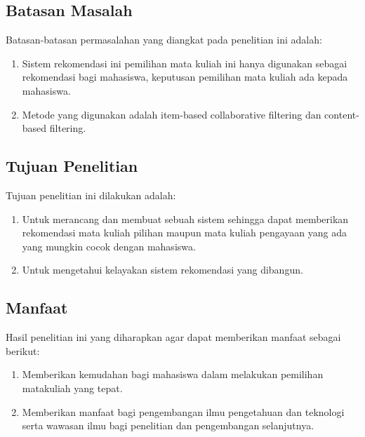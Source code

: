 \subsection{Batasan Masalah}
Batasan-batasan permasalahan yang diangkat pada penelitian ini adalah:
\begin{enumerate}
      \setlength\itemsep{0em}
      \item Sistem rekomendasi ini pemilihan mata kuliah
            ini hanya digunakan sebagai rekomendasi bagi
            mahasiswa, keputusan pemilihan mata kuliah
            ada kepada mahasiswa.
      \item Metode yang digunakan adalah item-based
            collaborative filtering dan content-based
            filtering.
\end{enumerate}

\subsection{Tujuan Penelitian}
Tujuan penelitian ini dilakukan adalah:
\begin{enumerate}
      \setlength\itemsep{0em}
      \item Untuk merancang dan membuat sebuah sistem sehingga dapat memberikan rekomendasi mata kuliah pilihan
            maupun mata kuliah pengayaan yang ada yang mungkin cocok dengan mahasiswa.
      \item Untuk
            mengetahui kelayakan sistem rekomendasi yang dibangun.
\end{enumerate}

\subsection{Manfaat}
Hasil penelitian ini yang diharapkan agar dapat memberikan manfaat sebagai berikut:
\begin{enumerate}
      \setlength\itemsep{0em}
      \item Memberikan kemudahan bagi mahasiswa dalam melakukan pemilihan matakuliah yang tepat.
      \item Memberikan manfaat bagi pengembangan ilmu pengetahuan dan teknologi serta wawasan ilmu bagi
            penelitian dan pengembangan selanjutnya.
\end{enumerate}